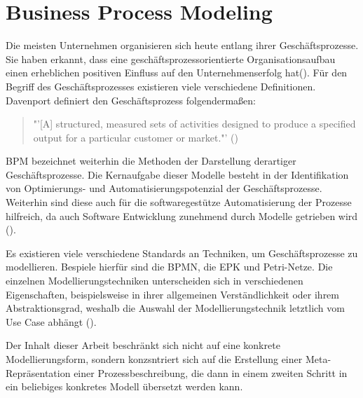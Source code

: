 \section{Business Process Modeling}
Die meisten Unternehmen organisieren sich heute entlang ihrer Geschäftsprozesse. Sie haben erkannt, dass eine geschäftsprozessorientierte Organisationsaufbau einen erheblichen positiven Einfluss auf den Unternehmenserfolg hat(\cite[vgl.][1]{BPM2}). Für den Begriff des Geschäftsprozesses existieren viele verschiedene Definitionen. Davenport definiert den Geschäftsprozess folgendermaßen: 
\begin{quote}
"'[A] structured, measured sets of activities designed to produce a specified output for a particular customer or market."' (\cite[5]{DAVENPORT})
\end{quote} \ac{BPM} bezeichnet weiterhin die Methoden der Darstellung derartiger Geschäftsprozesse. Die Kernaufgabe dieser Modelle besteht in der Identifikation von Optimierungs- und Automatisierungspotenzial der Geschäftsprozesse. Weiterhin sind diese auch für die softwaregestütze Automatisierung der Prozesse hilfreich, da auch Software Entwicklung zunehmend durch Modelle getrieben wird (\cite[vgl.][74]{BPM}).\par
Es existieren viele verschiedene Standards an Techniken, um  Geschäftsprozesse zu modellieren. Bespiele hierfür sind die \ac{BPMN}, die \ac{EPK} und Petri-Netze. Die einzelnen Modellierungstechniken unterscheiden sich in verschiedenen Eigenschaften, beispielsweise in ihrer allgemeinen Verständlichkeit oder ihrem Abstraktionsgrad, weshalb die Auswahl der Modellierungstechnik letztlich vom Use Case abhängt (\cite[vgl.][75]{BPM2}).
\par
Der Inhalt dieser Arbeit beschränkt sich nicht auf eine konkrete Modellierungsform, sondern konzsntriert sich auf die Erstellung einer Meta-Repräsentation einer Prozessbeschreibung, die dann in einem zweiten Schritt in ein beliebiges konkretes Modell übersetzt werden kann.